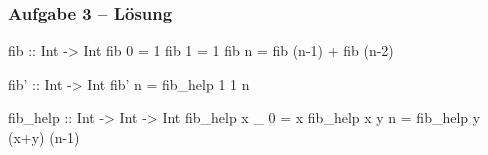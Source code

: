 \documentclass{beamer}
\begin{document}
	\begin{frame}[fragile] \frametitle{Aufgabe 3 -- Lösung}
		\begin{codebox}
fib :: Int -> Int
fib 0 = 1
fib 1 = 1
fib n = fib (n-1) + fib (n-2)
		\end{codebox}
	
		\begin{codebox}
fib' :: Int -> Int
fib' n = fib_help 1 1 n

fib_help :: Int -> Int -> Int
fib_help x _ 0 = x
fib_help x y n = fib_help y (x+y) (n-1)
		\end{codebox}
	\end{frame}



%
%	
%
%
%

%
\end{document}
